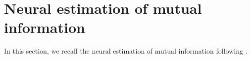 \section{Neural estimation of mutual information}

In this section,
we recall the neural estimation of mutual information
following
\cite{BBROBCH18mut}.

